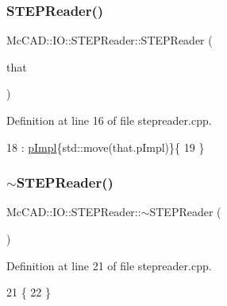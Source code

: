 \subsubsection{\texorpdfstring{S\+T\+E\+P\+Reader()}{STEPReader()}\hspace{0.1cm}{\footnotesize\ttfamily [3/6]}}
{\footnotesize\ttfamily Mc\+C\+A\+D\+::\+I\+O\+::\+S\+T\+E\+P\+Reader\+::\+S\+T\+E\+P\+Reader (\begin{DoxyParamCaption}\item[{\hyperlink{classMcCAD_1_1IO_1_1STEPReader}{S\+T\+E\+P\+Reader} \&\&}]{that }\end{DoxyParamCaption})}



Definition at line 16 of file stepreader.\+cpp.


\begin{DoxyCode}
18     : \hyperlink{classMcCAD_1_1IO_1_1STEPReader_a3bbb72987d6bad33c403c85401c62160}{pImpl}\{std::move(that.pImpl)\}\{
19 \}
\end{DoxyCode}
\mbox{\label{classMcCAD_1_1IO_1_1STEPReader_a7c17878fa8612e112c010f71ce24b887}} 
\subsubsection{\texorpdfstring{$\sim$\+S\+T\+E\+P\+Reader()}{~STEPReader()}\hspace{0.1cm}{\footnotesize\ttfamily [1/2]}}
{\footnotesize\ttfamily Mc\+C\+A\+D\+::\+I\+O\+::\+S\+T\+E\+P\+Reader\+::$\sim$\+S\+T\+E\+P\+Reader (\begin{DoxyParamCaption}{ }\end{DoxyParamCaption})}



Definition at line 21 of file stepreader.\+cpp.


\begin{DoxyCode}
21                               \{
22 \}
\end{DoxyCode}
\mbox{\label{classMcCAD_1_1IO_1_1STEPReader_aa6ca64ed74bc7c6fcf079c3742de34eb}} 
